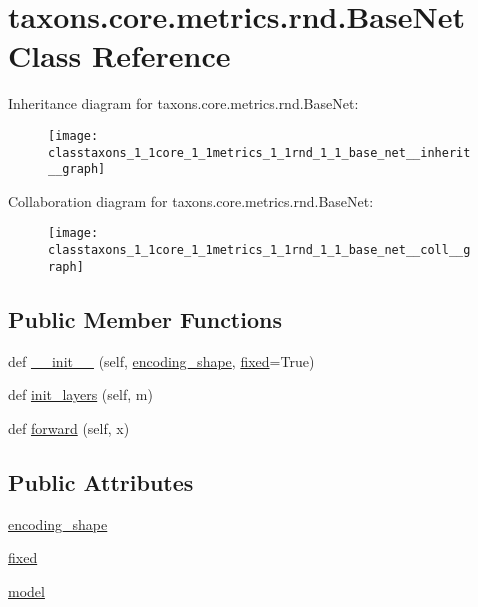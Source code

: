 \hypertarget{classtaxons_1_1core_1_1metrics_1_1rnd_1_1_base_net}{}\section{taxons.\+core.\+metrics.\+rnd.\+Base\+Net Class Reference}
\label{classtaxons_1_1core_1_1metrics_1_1rnd_1_1_base_net}


Inheritance diagram for taxons.\+core.\+metrics.\+rnd.\+Base\+Net\+:
\nopagebreak
\begin{figure}[H]
\begin{center}
\leavevmode
\texttt{[image: classtaxons\_1\_1core\_1\_1metrics\_1\_1rnd\_1\_1\_base\_net\_\_inherit\_\_graph]}
\end{center}
\end{figure}


Collaboration diagram for taxons.\+core.\+metrics.\+rnd.\+Base\+Net\+:
\nopagebreak
\begin{figure}[H]
\begin{center}
\leavevmode
\texttt{[image: classtaxons\_1\_1core\_1\_1metrics\_1\_1rnd\_1\_1\_base\_net\_\_coll\_\_graph]}
\end{center}
\end{figure}
\subsection*{Public Member Functions}
\begin{DoxyCompactItemize}
\item 
def \hyperlink{classtaxons_1_1core_1_1metrics_1_1rnd_1_1_base_net_a11432115baefa02d597915dc19acdcce}{\+\_\+\+\_\+init\+\_\+\+\_\+} (self, \hyperlink{classtaxons_1_1core_1_1metrics_1_1rnd_1_1_base_net_af96eb504fdce3ccecf696d2beda62651}{encoding\+\_\+shape}, \hyperlink{classtaxons_1_1core_1_1metrics_1_1rnd_1_1_base_net_a5daef61f0b70960433a652ef1a3f725a}{fixed}=True)
\item 
def \hyperlink{classtaxons_1_1core_1_1metrics_1_1rnd_1_1_base_net_a50411764e92a5eb0c9a7932ce9a13f87}{init\+\_\+layers} (self, m)
\item 
def \hyperlink{classtaxons_1_1core_1_1metrics_1_1rnd_1_1_base_net_a9f0087c9f479cf1d79f1a937495b9847}{forward} (self, x)
\end{DoxyCompactItemize}
\subsection*{Public Attributes}
\begin{DoxyCompactItemize}
\item 
\hyperlink{classtaxons_1_1core_1_1metrics_1_1rnd_1_1_base_net_af96eb504fdce3ccecf696d2beda62651}{encoding\+\_\+shape}
\item 
\hyperlink{classtaxons_1_1core_1_1metrics_1_1rnd_1_1_base_net_a5daef61f0b70960433a652ef1a3f725a}{fixed}
\item 
\hyperlink{classtaxons_1_1core_1_1metrics_1_1rnd_1_1_base_net_a4b6490a67a58d6c7ce97dffcdf57c846}{model}
\end{DoxyCompactItemize}


